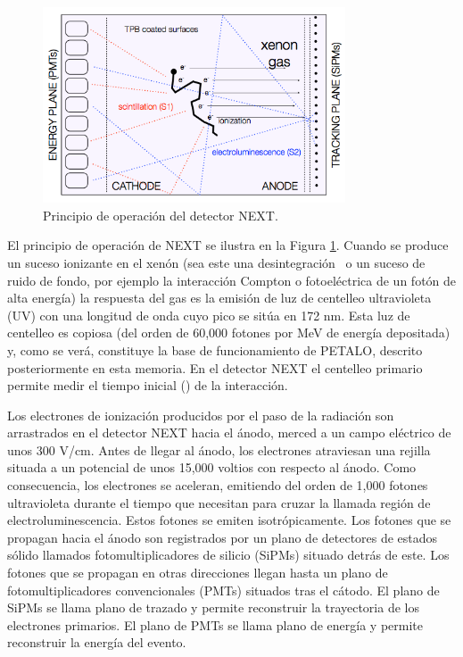 \begin{figure}
\centering
\includegraphics[width=0.8\textwidth]{img/EL.png}
\caption{\small Principio de operación del detector NEXT. 
} \label{fig.EL}
\end{figure}
                                    
El principio de operación de NEXT se ilustra en la Figura \ref{fig.EL}. Cuando se produce un suceso ionizante en el xenón (sea este una desintegración \bb\ o un suceso de ruido de fondo, por ejemplo la interacción Compton o fotoeléctrica de un fotón de alta energía) la respuesta del gas es la emisión de luz de centelleo ultravioleta (UV) con una longitud de onda cuyo pico se sitúa en 172 nm. Esta luz de centelleo es copiosa (del orden de 60,000 fotones por MeV de energía depositada) y, como se verá, constituye la base de funcionamiento de PETALO, descrito posteriormente en esta memoria. En el detector NEXT el centelleo primario permite medir el tiempo inicial (\tto) de la interacción.

Los electrones de ionización producidos por el paso de la radiación son arrastrados en el detector NEXT hacia el ánodo, merced a un campo eléctrico de unos 300 V/cm. Antes de llegar al ánodo, los electrones atraviesan una rejilla situada a un potencial de unos 15,000 voltios con respecto al ánodo. Como consecuencia, los electrones se aceleran, emitiendo del orden de 1,000 fotones ultravioleta durante el tiempo que necesitan para cruzar la llamada región de electroluminescencia. Estos fotones se emiten isotrópicamente. Los fotones que se propagan hacia el ánodo son registrados por un plano de detectores de estados sólido llamados fotomultiplicadores de silicio (SiPMs) situado detrás de este. Los fotones que se propagan en otras direcciones llegan hasta un plano de fotomultiplicadores convencionales (PMTs) situados tras el cátodo. El plano de SiPMs se llama plano de trazado y permite reconstruir la trayectoria de los electrones primarios. El plano de PMTs se llama plano de energía y permite reconstruir la energía del evento. 

